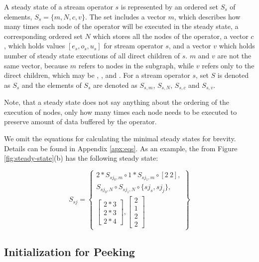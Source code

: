 A steady state of a stream operator $s$ is represented by an
ordered set $S_s$ of elements, $S_s = \{m, N, c, v\}$. The set
includes a vector $m$, which describes how many times each
{\StreamIt} node of the operator will be executed in the steady
state, a corresponding ordered set $N$ which stores all the nodes
of the operator, a vector $c$, which holds values $[e_s, o_s,
u_s]$ for stream operator $s$, and a vector $v$ which holds number
of steady state executions of all direct children of $s$. $m$ and
$v$ are not the same vector, because $m$ refers to nodes in the
subgraph, while $v$ refers only to the direct children, which may
be {\filters}, {\pipelines}, {\splitters} and {\feedbackloops}.
For a stream operator $s$, set $S$ is denoted as $S_s$ and the
elements of $S_s$ are denoted as $S_{s,m}$, $S_{s,N}$, $S_{s,c}$
and $S_{s,v}$.

Note, that a steady state does not say anything about the ordering
of the execution of nodes, only how many times each node needs to
be executed to preserve amount of data buffered by the operator.

We omit the equations for calculating the minimal steady states
for brevity. Details can be found in Appendix \ref{apx:eqs}. As an
example, the {\splitjoin} from Figure \ref{fig:steady-state}(b) has
the following steady state:

\begin{displaymath}
S_{sj} = \left\{
\begin{array}{c}
2 * S_{sj_0, m} \circ 1 * S_{sj_1, m} \circ [2\ 2], \\
S_{sj_0, N} \circ S_{sj_1, N} \circ \{sj_s, sj_j\}, \\
\left[
\begin{array}{c}
2 * 3 \\ 2 * 3 \\ 2 * 4
\end{array}
\right], \left[
\begin{array}{c}
2 \\ 1 \\ 2 \\ 2
\end{array}\right]
\end{array} \right\}
\end{displaymath}

\subsection{Initialization for Peeking}
\label{sec:init-peeking}

